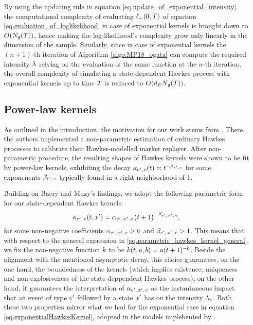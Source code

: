 \documentclass[10pt, article,table]{article}
\begin{document}
By using the updating rule in equation \eqref{eq.update_of_exponential_intensity}, the computational complexity of evaluating $\lplus(0,T)$ of equation \eqref{eq.evaluation_of_loglikelihood} in case of exponential kernels is brought down to $O(\groundProc(T))$, hence making the log-likelihood's complexity grow only linearly in the dimension of the sample. 
Similarly, since in case of exponential kernels the $(n+1)$-th iteration of Algorithm \ref{algo.MP18_ogata} can compute the required intensity $\bar{\intensity[]}$ relying on the evaluation of the same function at the $n$-th iteration, the overall complexity of simulating a state-dependent Hawkes process with exponential kernels up to time $\timeHorizon$ is reduced to $O(\numEventTypes\groundProc(\timeHorizon))$.

\subsection{Power-law kernels}\label{sec.powerlaw_kernels}
As outlined in the introduction, the motivation for our work stems from  \citealp{BM14haw}. There, the authors implemented a non-parametric estimation of ordinary Hawkes processes to calibrate their Hawkes-modelled market replayer. After non-parametric procedure, the resulting shapes of Hawkes kernels were shown to be fit by power-law kernels, exhibiting the decay $\hawkesKernel\subscriptee(t) \asymp t^{-\decCoef\subscriptee}$ for some exponenents $\decCoef\subscriptee$ typically found in a right neighborhood of $1$.

Building on Bacry and Muzy's findings, we adopt the following parametric form for our state-dependent Hawkes kernels:
\begin{equation}\label{eq.powerlaw_kernels}
 \hawkesKernel\subscriptee(t,\xone) 
 = \impCoef\subscriptexe \big( t+ 1 \big)^{-\decCoef\subscriptexe},
\end{equation}
for some non-negative coefficients $\impCoef\subscriptexe \geq 0$ and $\decCoef\subscriptexe > 1$. 
This means that with respect to the general expression in \eqref{eq.parametric_hawkes_kernel_general}, we fix the non-negative function $\parametricHawkesKernel$ to be $\parametricHawkesKernel(t,a,b) = a(t+1)^{-b}$.  
Beside the alignment with the mentioned asymptotic decay, this choice guarantees, on the one hand, the boundedness of the kernels (which implies existence, uniqueness and non-explosiveness of the state-deppendent Hawkes process); on the other hand, it guarantees the interpretation of $\impCoef\subscriptexe$ as the instantaneous impact  that an event of type $\eone$ followed by a state $\xone$ has on the intensity $\intensity[e]$. Both these two properties mirror what we had for the exponential case in equation \eqref{eq.exponentialHawkesKernel}, adopted in the models implebented by \citealp{MP18sta}.
\end{document}
